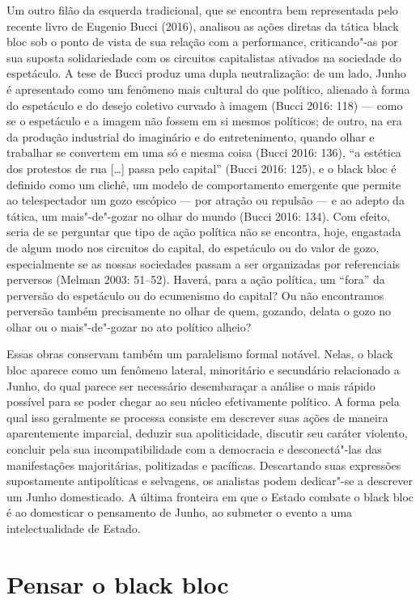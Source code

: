 Um outro filão da esquerda tradicional, que se encontra bem representada
pelo recente livro de Eugenio Bucci (2016), analisou as ações diretas da
tática black bloc sob o ponto de vista de sua relação com a performance,
criticando"-as por sua suposta solidariedade com os circuitos
capitalistas ativados na sociedade do espetáculo. A tese de Bucci produz
uma dupla neutralização: de um lado, Junho é apresentado como um
fenômeno mais cultural do que político, alienado à forma do espetáculo e
do desejo coletivo curvado à imagem (Bucci 2016: 118) --- como se o
espetáculo e a imagem não fossem em si mesmos políticos; de outro, na
era da produção industrial do imaginário e do entretenimento, quando
olhar e trabalhar se convertem em uma só e mesma coisa (Bucci 2016:
136), ``a estética dos protestos de rua {[}\ldots{}{]} passa pelo
capital'' (Bucci 2016: 125), e o black bloc é definido como um clichê,
um modelo de comportamento emergente que permite ao telespectador um
gozo escópico --- por atração ou repulsão --- e ao adepto da tática, um
mais"-de"-gozar no olhar do mundo (Bucci 2016: 134). Com efeito, seria de
se perguntar que tipo de ação política não se encontra, hoje, engastada
de algum modo nos circuitos do capital, do espetáculo ou do valor de
gozo, especialmente se as nossas sociedades passam a ser organizadas por
referenciais perversos (Melman 2003: 51--52). Haverá, para a ação
política, um ``fora'' da perversão do espetáculo ou do ecumenismo do
capital? Ou não encontramos perversão também precisamente no olhar de
quem, gozando, delata o gozo no olhar ou o mais"-de"-gozar no ato político
alheio?

Essas obras conservam também um paralelismo formal notável. Nelas, o
black bloc aparece como um fenômeno lateral, minoritário e secundário
relacionado a Junho, do qual parece ser necessário desembaraçar a
análise o mais rápido possível para se poder chegar ao seu núcleo
efetivamente político. A forma pela qual isso geralmente se processa
consiste em descrever suas ações de maneira aparentemente imparcial,
deduzir sua apoliticidade, discutir seu caráter violento, concluir pela
sua incompatibilidade com a democracia e desconectá"-las das
manifestações majoritárias, politizadas e pacíficas. Descartando suas
expressões supostamente antipolíticas e selvagens, os analistas podem
dedicar"-se a descrever um Junho domesticado. A última fronteira em que o
Estado combate o black bloc é ao domesticar o pensamento de Junho, ao
submeter o evento a uma intelectualidade de Estado.

\section{Pensar o black bloc}

